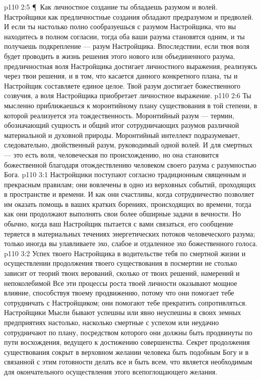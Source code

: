 \vs p110 2:5 \P\ Как личностное создание ты обладаешь разумом и волей. Настройщики как предличностные создания обладают предразумом и предволей. И если ты настолько полно сообразуешься с разумом Настройщика, что вы находитесь в полном согласии, тогда оба ваши разума становятся одним, и ты получаешь подкрепление --- разум Настройщика. Впоследствии, если твоя воля будет проводить в жизнь решения этого нового или объединенного разума, предличностная воля Настройщика достигает личностного выражения, реализуясь через твои решения, и в том, что касается данного конкретного плана, ты и Настройщик составляете единое целое. Твой разум достигает божественного созвучия, а воля Настройщика приобретает личностное выражение.
\vs p110 2:6 Ты мысленно приближаешься к моронтийному плану существования в той степени, в которой реализуется эта тождественность. Моронтийный разум --- термин, обозначающий сущность и общий итог сотрудничающих разумов различной материальной и духовной природы. Моронтийный интеллект подразумевает, следовательно, двойственный разум, руководимый одной волей. И для смертных --- это есть воля, человеческая по происхождению, но она становится божественной благодаря отождествлению человеком своего разума с разумностью Бога.
\vs p110 3:1 Настройщики поступают согласно традиционным священным и прекрасным правилам; они вовлечены в одно из верховных событий, проходящих в пространстве и времени. И как они счастливы, когда сотрудничество позволяет им оказать помощь в ваших кратких борениях, происходящих во времени, тогда как они продолжают выполнять свои более обширные задачи в вечности. Но обычно, когда ваш Настройщик пытается с вами связаться, его сообщение теряется в материальных течениях энергетических потоков человеческого разума; только иногда вы улавливаете эхо, слабое и отдаленное эхо божественного голоса.
\vs p110 3:2 Успех твоего Настройщика в водительстве тебя по смертной жизни и осуществлении продолжения твоего существования в посмертии не столько зависит от теорий твоих верований, сколько от твоих решений, намерений и непоколебимой  Все эти процессы роста твоей личности оказывают мощное влияние, способствуя твоему продвижению, потому что они помогает тебе сотрудничать с Настройщиком; они помогают тебе прекратить сопротивляться. Настройщики Мысли бывают успешны или явно неуспешны в своих земных предприятиях настолько, насколько смертные с успехом или неудачно сотрудничают по плану, посредством которого они должны быть продвинуты по пути восхождения, ведущего к достижению совершенства. Секрет продолжения существования сокрыт в верховном желании человека быть подобным Богу и в связанной с этим готовности делать все и быть всем, что является необходимым для окончательного осуществления этого всепоглощающего желания.
